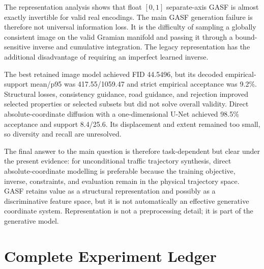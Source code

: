 \documentclass[12pt,a4paper,oneside]{report}
\begin{document}
The representation analysis shows that float $[0,1]$ separate-axis GASF is almost exactly invertible for valid real encodings. The main GASF generation failure is therefore not universal information loss. It is the difficulty of sampling a globally consistent image on the valid Gramian manifold and passing it through a bound-sensitive inverse and cumulative integration. The legacy representation has the additional disadvantage of requiring an imperfect learned inverse.

The best retained image model achieved FID 44.5496, but its decoded empirical-support mean/p95 was 417.55/1059.47 and strict empirical acceptance was 9.2\%. Structural losses, consistency guidance, road guidance, and rejection improved selected properties or selected subsets but did not solve overall validity. Direct absolute-coordinate diffusion with a one-dimensional U-Net achieved 98.5\% acceptance and support 8.4/25.6. Its displacement and extent remained too small, so diversity and recall are unresolved.

The final answer to the main question is therefore task-dependent but clear under the present evidence: for unconditional traffic trajectory synthesis, direct absolute-coordinate modelling is preferable because the training objective, inverse, constraints, and evaluation remain in the physical trajectory space. GASF retains value as a structural representation and possibly as a discriminative feature space, but it is not automatically an effective generative coordinate system. Representation is not a preprocessing detail; it is part of the generative model.

\appendix

\chapter{Complete Experiment Ledger}
\label{app:ledger}
\end{document}
